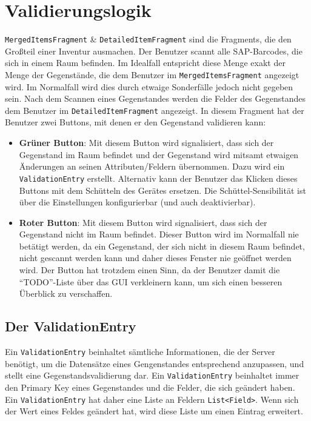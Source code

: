 \hypertarget{validierungslogik}{%
\section{Validierungslogik}\label{validierungslogik}}

\texttt{MergedItemsFragment} \& \texttt{DetailedItemFragment} sind die
Fragments, die den Großteil einer Inventur ausmachen. Der Benutzer
scannt alle SAP-Barcodes, die sich in einem Raum befinden. Im Idealfall
entspricht diese Menge exakt der Menge der Gegenstände, die dem Benutzer
im \texttt{MergedItemsFragment} angezeigt wird. Im Normalfall wird dies
durch etwaige Sonderfälle jedoch nicht gegeben sein. Nach dem Scannen
eines Gegenstandes werden die Felder des Gegenstandes dem Benutzer im
\texttt{DetailedItemFragment} angezeigt. In diesem Fragment hat der
Benutzer zwei Buttons, mit denen er den Gegenstand validieren kann:

\begin{itemize}
\tightlist
\item
  \textbf{Grüner Button}: Mit diesem Button wird signalisiert, dass sich
  der Gegenstand im Raum befindet und der Gegenstand wird mitsamt
  etwaigen Änderungen an seinen Attributen/Feldern übernommen. Dazu wird
  ein \texttt{ValidationEntry} erstellt. Alternativ kann der Benutzer
  das Klicken dieses Buttons mit dem Schütteln des Gerätes ersetzen. Die
  Schüttel-Sensibilität ist über die Einstellungen konfigurierbar (und
  auch deaktivierbar).
\item
  \textbf{Roter Button}: Mit diesem Button wird signalisiert, dass sich
  der Gegenstand nicht im Raum befindet. Dieser Button wird im
  Normalfall nie betätigt werden, da ein Gegenstand, der sich nicht in
  diesem Raum befindet, nicht gescannt werden kann und daher dieses
  Fenster nie geöffnet werden wird. Der Button hat trotzdem einen Sinn,
  da der Benutzer damit die ``TODO''-Liste über das GUI verkleinern
  kann, um sich einen besseren Überblick zu verschaffen.
\end{itemize}

\hypertarget{der-validationentry}{%
\subsection{Der ValidationEntry}\label{der-validationentry}}

Ein \texttt{ValidationEntry} beinhaltet sämtliche Informationen, die der
Server benötigt, um die Datensätze eines Gengenstandes entsprechend
anzupassen, und stellt eine Gegenstandsvalidierung dar. Ein
\texttt{ValidationEntry} beinhaltet immer den Primary Key eines
Gegenstandes und die Felder, die sich geändert haben. Ein
\texttt{ValidationEntry} hat daher eine Liste an Feldern
\texttt{List\textless{}Field\textgreater{}}. Wenn sich der Wert eines
Feldes geändert hat, wird diese Liste um einen Eintrag erweitert.

